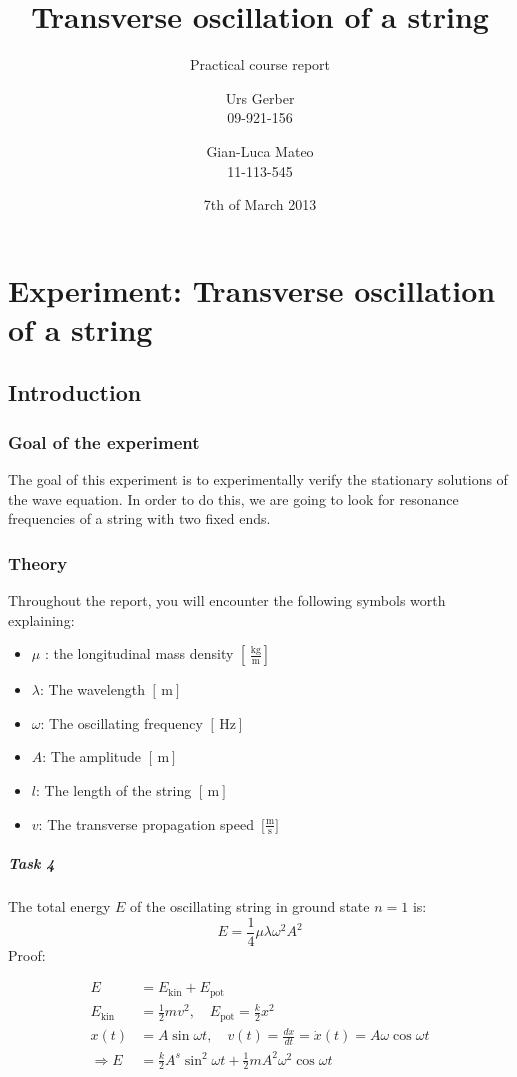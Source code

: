 \documentclass{scrreprt}
\author{Urs Gerber\\09-921-156 \and Gian-Luca Mateo\\11-113-545}
\date{7th of March 2013}
\title{Transverse oscillation of a string}
\subtitle{Practical course report}
\newcommand{\unit}[1]{\ensuremath{\, \mathrm{#1}}}
\begin{document}
\maketitle

\tableofcontents
\newpage

\chapter{Experiment: Transverse oscillation of a string}
\section{Introduction}

\subsection{Goal of the experiment}
The goal of this experiment is to experimentally verify the stationary solutions of the wave equation. In order to do this, we are going to look for resonance frequencies of a string with two fixed ends.
\subsection{Theory}
Throughout the report, you will encounter the following symbols worth explaining:
\begin{itemize}
\item $\mu$ : the longitudinal mass density $[\unit{\frac{kg}{m}}]$
\item $\lambda$: The wavelength $[\unit{m}]$
\item $\omega$: The oscillating frequency $[\unit{Hz}]$
\item $A$: The amplitude $[\unit{m}]$
\item $l$: The length of the string $[\unit{m}]$
\item $v$: The transverse propagation speed $\unit{[\frac{m}{s}}]$
\end{itemize}

\paragraph*{Task 4}
The total energy $E$ of the oscillating string in ground state $n=1$ is:
\begin{equation}
E=\frac{1}{4} \mu \lambda \omega^2 A^2
\end{equation}
Proof:

\begin{align}
E &= E_{\text{kin}} + E_{\text{pot}}\\
E_{\text{kin}} &= \frac{1}{2} m v^2 , \quad E_{\text{pot}} = \frac{k}{2} x^2\\
x(t) &= A \sin{\omega t} , \quad v(t) = \frac{dx}{dt} = \dot{x}(t) = A \omega \cos{\omega t}\\
\Rightarrow E &= \frac{k}{2} A^s \sin^2{\omega t} + \frac{1}{2} m A^2 \omega^2 \cos{\omega t}
\end{align}
\end{document}
